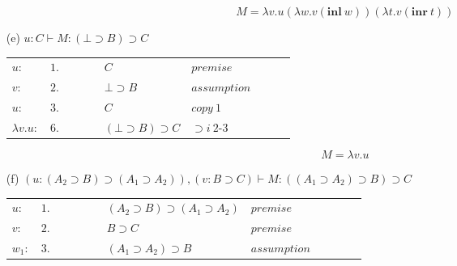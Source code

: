 \documentclass[11pt,a4paper]{article}
\begin{document}
\begin{itemize}
\begin{table}[H]
\begin{tabular}{*{10}{l}}
		\end{tabular}
		\end{table}
		
		\[ \boxed{M = \lambda v . u(\lambda w . v(\textbf{inl} \ w))(\lambda t . v(\textbf{inr} \ t))} \]
		
		
\item[(e)]
  $u:C \vdash M: (\bot \supset B) \supset C$
		\begin{table}[H]
		\centering
		\begin{tabular}{*{10}{l}}
			
			$u:$ & $1.$ & & & & $C$ & $premise$ & & &\\
			
			\cline{3-10}
			
			$v:$ & $2.$ & \multicolumn{1}{|c}{} & &  & $\bot \supset B$ & $assumption$ & & &\multicolumn{1}{c|}{}\\
			
			$u:$ & $3.$ & \multicolumn{1}{|c}{} & &  & $C$ & $copy \ 1$ & & &\multicolumn{1}{c|}{}\\
			
			\cline{3-10}
			
			$\lambda v . u:$ & $6.$ & & & & $(\bot \supset B) \supset C$ & $\supset i \ 2$-$3$ & & & \\
			
		\end{tabular}
		\end{table}
		
		\[ \boxed{M = \lambda v . u} \]
		
		
\item[(f)]
  $(u:(A_2 \supset B) \supset (A_1 \supset A_2)), (v:B \supset C)
  \vdash M: ((A_1 \supset A_2) \supset B) \supset C$


		\begin{table}[H]
		\hspace*{-3em}
		\begin{tabular}{*{12}{l}}
		
			$u:$ & $1.$ & & & & & $(A_2 \supset B) \supset (A_1 \supset A_2)$ & $premise$ & & & &\\
		
			$v:$ & $2.$ & & & & & $B \supset C$ & $premise$ & & & &\\
			
			\cline{3-12}
			
			$w_1:$ & $3.$ &\multicolumn{1}{|c}{} & & & & $(A_1 \supset A_2) \supset B$ & $assumption$ & & & &\multicolumn{1}{c|}{}\\
						

\end{tabular}
\end{table}
\end{itemize}
\end{document}
